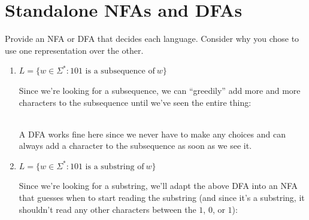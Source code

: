 \documentclass[fleqn]{article}
\begin{document}
\section{Standalone NFAs and DFAs}
Provide an NFA or DFA that decides each language. Consider why you chose to use one representation over the other.
\begin{enumerate}
    \item $L = \{w \in \Sigma^* : \text{101 is a subsequence of}~w\}$
    \begin{answer}
        Since we're looking for a subsequence, we can ``greedily'' add more and more characters to the subsequence until we've seen the entire thing: \\
         \\
        A DFA works fine here since we never have to make any choices and can always
        add a character to the subsequence as soon as we see it.
    \end{answer}
    \item $L = \{w \in \Sigma^* : \text{101 is a substring of}~w\}$
    \begin{answer}
        Since we're looking for a substring, we'll adapt the above DFA into an NFA that guesses when to start reading the substring (and since it's a substring, it shouldn't read any other characters between the $1$, $0$, or $1$): \\
\end{answer}
\end{enumerate}
\end{document}
